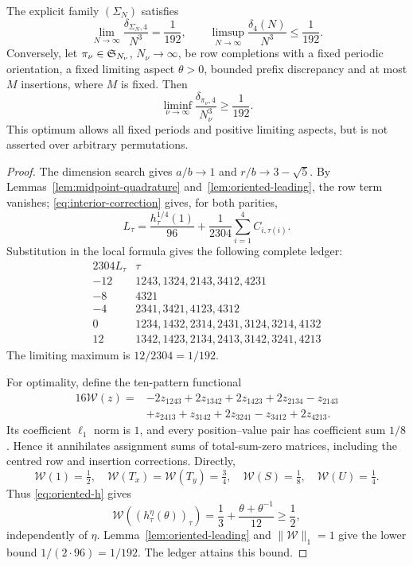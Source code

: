 \begin{theorem}\label{thm:sharp-four}
The explicit family $(\Sigma_N)$ satisfies
\[
 \lim_{N\to\infty}\frac{\delta_{\Sigma_N,4}}{N^3}=\frac1{192},
 \qquad
 \limsup_{N\to\infty}\frac{\delta_4(N)}{N^3}\le\frac1{192}.
\]
Conversely, let $\pi_\nu\in\mathfrak S_{N_\nu}$, $N_\nu\to\infty$, be row
completions with a fixed periodic orientation, a fixed limiting aspect
$\theta>0$, bounded prefix discrepancy and at most $M$ insertions,
where $M$ is fixed.  Then
\[
 \liminf_{\nu\to\infty}\frac{\delta_{\pi_\nu,4}}{N_\nu^3}\ge\frac1{192}.
\]
This optimum allows all fixed periods and positive limiting aspects, but
is not asserted over arbitrary permutations.
\end{theorem}

\begin{proof}
The dimension search gives $a/b\to1$ and $r/b\to3-\sqrt5$.
By Lemmas~\ref{lem:midpoint-quadrature} and~\ref{lem:oriented-leading}, the
row term vanishes; \eqref{eq:interior-correction} gives, for both parities,
\[
 L_\tau=\frac{h^{1/4}_\tau(1)}{96}
       +\frac1{2304}\sum_{i=1}^4 C_{i,\tau(i)}.
\]
Substitution in the local formula gives the following complete ledger:
\[
\begin{array}{c|l}
2304L_\tau&\tau\\\hline
-12&1243,1324,2143,3412,4231\\
-8&4321\\
-4&2341,3421,4123,4312\\
0&1234,1432,2314,2431,3124,3214,4132\\
12&1342,1423,2134,2413,3142,3241,4213
\end{array}
\]
The limiting maximum is $12/2304=1/192$.

For optimality, define the ten-pattern functional
\[
\begin{split}
16\mathcal W(z)={}&-2z_{1243}+2z_{1342}+2z_{1423}+2z_{2134}-z_{2143}\\
 &+z_{2413}+z_{3142}+2z_{3241}-z_{3412}+2z_{4213}.
\end{split}
\]
Its coefficient $\ell_1$ norm is $1$, and every position--value pair has
coefficient sum $1/8$.  Hence it annihilates assignment sums of total-sum-zero
matrices, including the centred row and insertion corrections.  Directly,
\[
 \mathcal W(1)=\tfrac12,\quad
 \mathcal W(T_x)=\mathcal W(T_y)=\tfrac34,\quad
 \mathcal W(S)=\tfrac18,\quad\mathcal W(U)=\tfrac14.
\]
Thus \eqref{eq:oriented-h} gives
\[
 \mathcal W((h^\eta_\tau(\theta))_\tau)
 =\frac13+\frac{\theta+\theta^{-1}}{12}\ge\frac12,
\]
independently of $\eta$.  Lemma~\ref{lem:oriented-leading} and
$\|\mathcal W\|_1=1$ give the lower bound $1/(2\cdot96)=1/192$.
The ledger attains this bound.
\end{proof}
